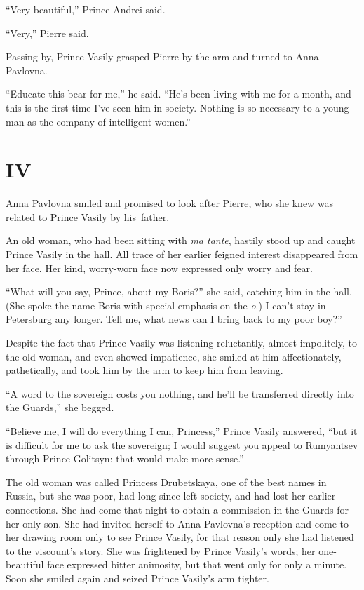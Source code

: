 ``Very beautiful,'' Prince Andrei said.

``Very,'' Pierre said.

Passing by, Prince Vasily grasped Pierre by the arm and turned to Anna
Pavlovna.

``Educate this bear for me,'' he said. ``He's been living with me for
a month, and this is the first time I've seen him in society. Nothing
is so necessary to a young man as the company of intelligent women.''

\section{IV} %

Anna Pavlovna smiled and promised to look after Pierre, who she knew
was related to Prince Vasily by his\ father.

An old woman, who had been sitting with \textit{ma tante}, hastily
stood up and caught Prince Vasily in the hall. All trace of her
earlier feigned interest disappeared from her face. Her kind,
worry-worn face now expressed only worry and fear.

``What will you say, Prince, about my Boris?'' she said, catching him
in the hall. (She spoke the name Boris with special emphasis on the
\textit{o}.) I can't stay in Petersburg any longer. Tell me, what news
can I bring back to my poor boy?''

Despite the fact that Prince Vasily was listening reluctantly, almost
impolitely, to the old woman, and even showed impatience, she smiled
at him affectionately, pathetically, and took him by the arm to keep
him from leaving.

``A word to the sovereign costs you nothing, and he'll be transferred
directly into the Guards,'' she begged.

``Believe me, I will do everything I can, Princess,'' Prince Vasily
answered, ``but it is difficult for me to ask the sovereign; I would
suggest you appeal to Rumyantsev through Prince Golitsyn: that would
make more sense.''

The old woman was called Princess Drubetskaya, one of the best names
in Russia, but she was poor, had long since left society, and had lost
her earlier connections. She had come that night to obtain a
commission in the Guards for her only son. She had invited herself to
Anna Pavlovna's reception and come to her drawing room only to see
Prince Vasily, for that reason only she had listened to the viscount's
story. She was frightened by Prince Vasily's words; her one-beautiful
face expressed bitter animosity, but that went only for only a
minute. Soon she smiled again and seized Prince Vasily's arm tighter.

